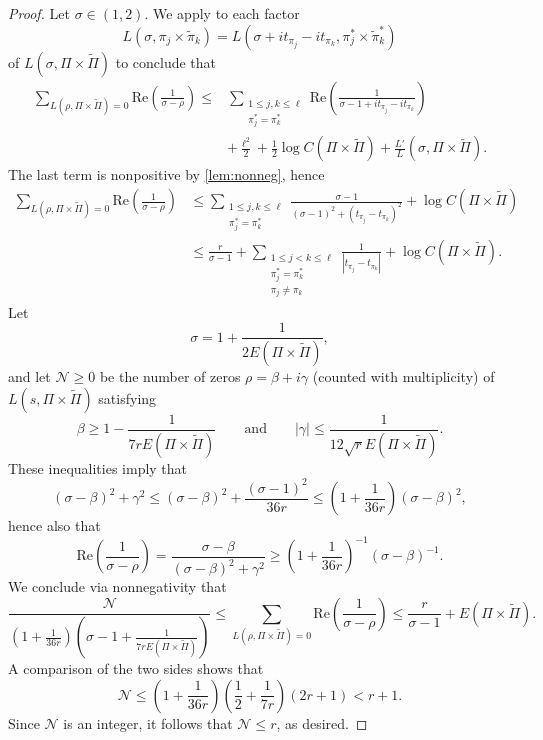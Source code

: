 \documentclass[12pt]{amsart}
\theoremstyle{definition}
\theoremstyle{remark}
\numberwithin{equation}{section}
\theoremstyle{plain}
\renewcommand{\tilde}{\widetilde}
\renewcommand{\Re}{\mathrm{Re}}
\newcommand{\re}{\Re}
\begin{document}
\begin{proof}
Let $\sigma\in(1,2)$. We apply \cite[Lemma~3.1]{Wattanawanichkul} to each factor
\[L(\sigma,\pi_j\times\tilde\pi_k)=L(\sigma+it_{\pi_j}-it_{\pi_k},\pi_j^*\times\tilde\pi_k^*)\]
of $L(\sigma,\Pi\times\tilde{\Pi})$ to conclude that
\begin{align*}
\sum_{L(\rho,\Pi\times\tilde{\Pi})=0}\re\left(\frac{1}{\sigma-\rho}\right)\leq
&\sum_{\substack{1\leq j,k\leq\ell\\\pi_j^*=\pi_k^*}}\re\left(\frac{1}{\sigma-1+it_{\pi_j}-it_{\pi_k}}\right)\\
&+\frac{\ell^2}{2}+\frac{1}{2}\log C(\Pi\times\tilde{\Pi})+\frac{L'}{L}(\sigma,\Pi\times\tilde{\Pi}).
\end{align*}
The last term is nonpositive by \cref{lem:nonneg}, hence
\begin{align*}
\sum_{L(\rho,\Pi\times\tilde{\Pi})=0}\re\left(\frac{1}{\sigma-\rho}\right)
&\leq\sum_{\substack{1\leq j,k\leq\ell\\\pi_j^*=\pi_k^*}}\frac{\sigma-1}{(\sigma-1)^2+(t_{\pi_j}-t_{\pi_k})^2}
+\log C(\Pi\times\tilde{\Pi})\\
&\leq\frac{r}{\sigma-1}+\sum_{\substack{1\leq j<k\leq\ell\\\pi_j^*=\pi_k^*\\\pi_j\neq\pi_k}}\frac{1}{|t_{\pi_j}-t_{\pi_k}|}
+\log C(\Pi\times\tilde{\Pi}).
\end{align*}
Let
\[
\sigma = 1+\frac{1}{2E(\Pi\times\tilde{\Pi})},
\]
and let $\mathcal{N}\geq 0$ be the number of zeros $\rho=\beta+i\gamma$ (counted with multiplicity) of $L(s,\Pi\times\tilde{\Pi})$ satisfying
\[
\beta\geq 1-\frac{1}{7rE(\Pi\times\tilde{\Pi})}
\qquad\text{and}\qquad
|\gamma|\leq\frac{1}{12\sqrt{r}E(\Pi\times\tilde{\Pi})}.
\]
These inequalities imply that
\[
(\sigma-\beta)^2+\gamma^2\leq(\sigma-\beta)^2+\frac{(\sigma-1)^2}{36r}\leq\left(1+\frac{1}{36r}\right)(\sigma-\beta)^2,
\]
hence also that
\[
\re\left(\frac{1}{\sigma-\rho}\right)=\frac{\sigma-\beta}{(\sigma-\beta)^2+\gamma^2}\geq
\left(1+\frac{1}{36r}\right)^{-1}(\sigma-\beta)^{-1}.
\]
We conclude via nonnegativity that
\[
\frac{\mathcal{N}}{\left(1+\frac{1}{36r}\right)\left(\sigma-1+\frac{1}{7rE(\Pi\times\tilde{\Pi})}\right)}\leq\sum_{L(\rho,\Pi\times\tilde{\Pi})=0}\re\left(\frac{1}{\sigma-\rho}\right)\leq \frac{r}{\sigma-1}+E(\Pi\times\tilde{\Pi}).
\]
A comparison of the two sides shows that
\[
\mathcal{N}\leq\left(1+\frac{1}{36r}\right)\left(\frac{1}{2}+\frac{1}{7r}\right)(2r+1)<r+1.
\]
Since $\mathcal{N}$ is an integer, it follows that $\mathcal{N}\leq r$, as desired.
\end{proof}
\end{document}
